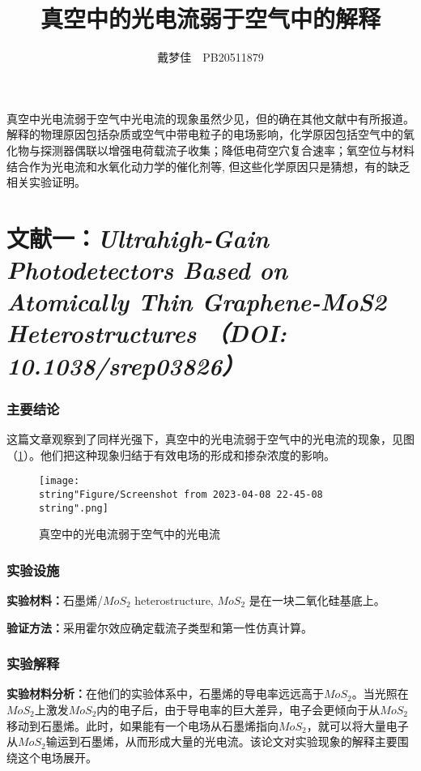 \documentclass[english]{ctexart}
\begin{document}
\title{真空中的光电流弱于空气中的解释}
\author{戴梦佳\ \ PB20511879}

\maketitle
真空中光电流弱于空气中光电流的现象虽然少见，但的确在其他文献中有所报道。解释的物理原因包括杂质或空气中带电粒子的电场影响，化学原因包括空气中的氧化物与探测器偶联以增强电荷载流子收集；降低电荷空穴复合速率；氧空位与材料结合作为光电流和水氧化动力学的催化剂等,
但这些化学原因只是猜想，有的缺乏相关实验证明。

\part{文献一：\emph{Ultrahigh-Gain Photodetectors Based on Atomically Thin
Graphene-MoS2 Heterostructures （DOI: 10.1038/srep03826）}}

\section{主要结论}

这篇文章观察到了同样光强下，真空中的光电流弱于空气中的光电流的现象，见图（\ref{fig1}）。他们把这种现象归结于有效电场的形成和掺杂浓度的影响。

\begin{figure}
\texttt{[image: \\string"Figure/Screenshot from 2023-04-08 22-45-08\\string".png]}

\caption{真空中的光电流弱于空气中的光电流}

\label{fig1}
\end{figure}


\section{实验设施}

\textbf{实验材料：}石墨烯/$MoS_{2}$ heterostructure, $MoS_{2}$ 是在一块二氧化硅基底上。

\textbf{验证方法：}采用霍尔效应确定载流子类型和第一性仿真计算。

\section{实验解释}

\textbf{实验材料分析：}在他们的实验体系中，石墨烯的导电率远远高于$MoS_{2}$。当光照在$MoS_{2}$上激发$MoS_{2}$内的电子后，由于导电率的巨大差异，电子会更倾向于从$MoS_{2}$移动到石墨烯。此时，如果能有一个电场从石墨烯指向$MoS_{2}$，就可以将大量电子从$MoS_{2}$输运到石墨烯，从而形成大量的光电流。该论文对实验现象的解释主要围绕这个电场展开。
\end{document}
